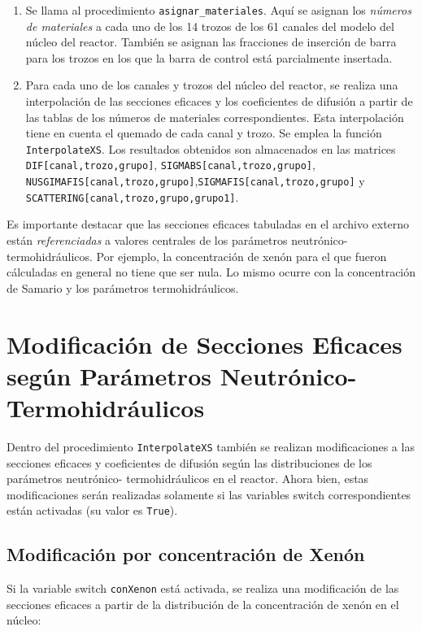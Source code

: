  
 \begin{enumerate}
 	\item Se llama al procedimiento \texttt{asignar\_materiales}. Aquí se asignan los \emph{números de materiales} a cada uno de los 14 trozos de los 61 canales del modelo del núcleo del reactor. También se asignan las fracciones de inserción de barra para los trozos en los que la barra de control está parcialmente insertada. 
 	
 	\item Para cada uno de los canales y trozos del núcleo del reactor, se realiza una interpolación de las secciones eficaces y los coeficientes de difusión a partir de las tablas de los números de materiales correspondientes. Esta interpolación tiene en cuenta el quemado de cada canal y trozo. Se emplea la función \texttt{InterpolateXS}. Los resultados obtenidos son almacenados en las matrices \texttt{DIF[canal,trozo,grupo]}, \texttt{SIGMABS[canal,trozo,grupo]}, \texttt{NUSGIMAFIS[canal,trozo,grupo]},\texttt{SIGMAFIS[canal,trozo,grupo]} y \texttt{SCATTERING[canal,trozo,grupo,grupo1]}. 	
 	
 \end{enumerate}

Es importante destacar que las secciones eficaces tabuladas en el archivo externo están \emph{referenciadas} a valores centrales de los parámetros neutrónico- termohidráulicos. Por ejemplo, la concentración de xenón para el que fueron cálculadas en general no tiene que ser nula. Lo mismo ocurre con la concentración de Samario y los parámetros termohidráulicos. 

\section{Modificación de Secciones Eficaces según Parámetros Neutrónico-Termohidráulicos}

Dentro del procedimiento \texttt{InterpolateXS} también se realizan modificaciones a las secciones eficaces y coeficientes de difusión según las distribuciones de los parámetros neutrónico- termohidráulicos en el reactor. Ahora bien, estas modificaciones serán realizadas solamente si las variables switch correspondientes están activadas (su valor es \texttt{True}).

\subsection{Modificación por concentración de Xenón}
Si la variable switch \texttt{conXenon} está activada, se realiza una modificación de las secciones eficaces a partir de la distribución de la concentración de xenón en el núcleo:

